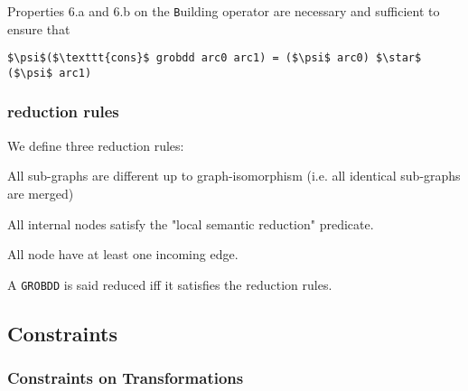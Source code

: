 \documentclass[a4paper,10pt]{article}
\newcommand{\GroBdd}{\texttt{GROBDD}}
\begin{document}
Properties 6.a and 6.b on the \texttt{B}uilding operator are necessary and sufficient to ensure that
\begin{lstlisting}
$\psi$($\texttt{cons}$ grobdd arc0 arc1) = ($\psi$ arc0) $\star$ ($\psi$ arc1)
\end{lstlisting}

\subsubsection{reduction rules}

We define three reduction rules: \begin{compactenum}
\item All sub-graphs are different up to graph-isomorphism (i.e. all identical sub-graphs are merged)
\item All internal nodes satisfy the "local semantic reduction" predicate.
\item All node have at least one incoming edge.
\end{compactenum}
A \GroBdd{} is said reduced iff it satisfies the reduction rules.

\subsection{Constraints}
\subsubsection{Constraints on Transformations}
\end{document}
